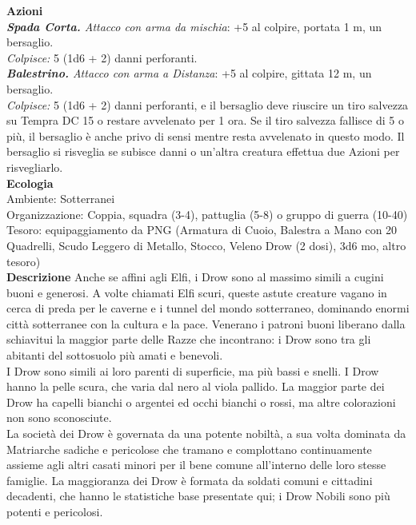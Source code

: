 \begin{multicols}{2}
\smallskip\textbf{Azioni}\\
\emph{\textbf{Spada Corta.} Attacco con arma da mischia}: +5 al colpire, portata 1 m, un bersaglio.\\
\emph{Colpisce:} 5 (1d6 + 2) danni perforanti.\\
\emph{\textbf{Balestrino.} Attacco con arma a Distanza}: +5 al colpire, gittata 12 m, un bersaglio.\\
\emph{Colpisce:} 5 (1d6 + 2) danni perforanti, e il bersaglio deve riuscire un tiro salvezza su Tempra DC  15 o restare avvelenato per 1 ora. Se il tiro salvezza fallisce di 5 o più, il bersaglio è anche privo di sensi mentre resta avvelenato in questo modo. Il bersaglio si risveglia se subisce danni o un'altra creatura effettua due Azioni per risvegliarlo.\\
\textbf{Ecologia}\\
Ambiente: Sotterranei\\
Organizzazione: Coppia, squadra (3-4), pattuglia (5-8) o gruppo di guerra (10-40)\\
Tesoro: equipaggiamento da PNG (Armatura di Cuoio, Balestra a Mano con 20 Quadrelli, Scudo Leggero di Metallo, Stocco, Veleno Drow (2 dosi), 3d6 mo, altro tesoro)\\
\textbf{Descrizione}
Anche se affini agli Elfi, i Drow sono al massimo simili a cugini buoni e generosi. A volte chiamati Elfi scuri, queste astute creature vagano in cerca di preda per le caverne e i tunnel del mondo sotterraneo, dominando enormi città sotterranee con la cultura e la pace. Venerano i patroni buoni liberano dalla schiavitui la maggior parte delle Razze che incontrano: i Drow sono tra gli abitanti del sottosuolo più amati e benevoli.\\

I Drow sono simili ai loro parenti di superficie, ma più bassi e snelli. I Drow hanno la pelle scura, che varia dal nero al viola pallido. La maggior parte dei Drow ha capelli bianchi o argentei ed occhi bianchi o rossi, ma altre colorazioni non sono sconosciute.\\

La società dei Drow è governata da una potente nobiltà, a sua volta dominata da Matriarche sadiche e pericolose che tramano e complottano continuamente assieme agli altri casati minori per il bene comune all'interno delle loro stesse famiglie. La maggioranza dei Drow è formata da soldati comuni e cittadini decadenti, che hanno le statistiche base presentate qui; i Drow Nobili sono più potenti e pericolosi.\\


\end{multicols}
